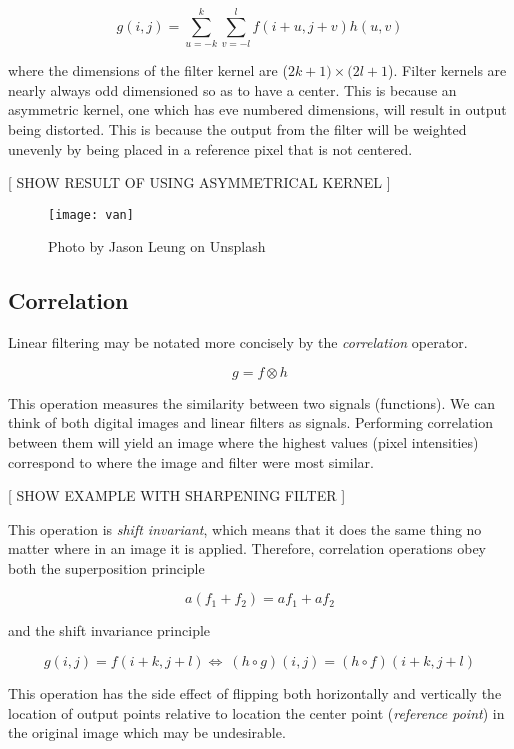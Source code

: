 \begin{equation} \label{eq:1}
g(i,j) = \sum_{u=-k}^{k}\sum_{v = -l}^{l}f(i+u,j+v)h(u,v)
\end{equation}


where the dimensions of the filter kernel are ($2k+1) \times (2l+1$). Filter kernels are nearly always odd dimensioned so as to have a center. This is because an asymmetric kernel, one which has eve numbered dimensions, will result in output being distorted. This is because the output from the filter will be weighted unevenly by being placed in a reference pixel that is not centered.

[ SHOW RESULT OF USING ASYMMETRICAL KERNEL ] 
\begin{figure}[ht!]
  \centering
  \centering\texttt{[image: van]}
  \caption{Photo by Jason Leung on Unsplash}
  \label{fig:roughDog}
\end{figure}


\subsection{Correlation}

Linear filtering may be notated more concisely by the \emph{correlation} operator.

\[g = f \otimes h\]

This operation measures the similarity between two signals (functions). We can think of both digital images and linear filters as signals. Performing correlation between them will yield an image where the highest values (pixel intensities) correspond to where the image and filter were most similar\cite{optimalKernel}.


[ SHOW EXAMPLE WITH SHARPENING FILTER ]

This operation is \emph{shift invariant}, which means that it does the same thing no matter where in an image it is applied. Therefore, correlation operations obey both the superposition principle

\[a(f_1 + f_2) = af_1 + af_2\]

and the shift invariance principle

\[g(i,j)=f(i+k,j+l) \Leftrightarrow\ (h\circ g)(i,j)=(h\circ f)(i+k,j+l)\]

This operation has the side effect of flipping both horizontally and vertically the location of output points relative to location the center point (\emph{reference point}) in the original image which may be undesirable.

